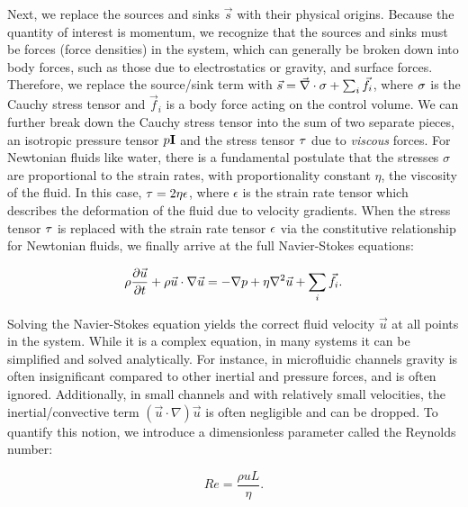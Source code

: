 			Next, we replace the sources and sinks $\vec{s}$ with their physical origins. Because the quantity of interest is momentum, we recognize that the sources and sinks must be forces (force densities) in the system, which can generally be broken down into body forces, such as those due to electrostatics or gravity, and surface forces. Therefore, we replace the source/sink term with $\vec{s}=\vec{\nabla}\cdot\mathbf{\sigma}+\sum_{i}\vec{f}_{i}$, where $\mathbf{\sigma}$ is the Cauchy stress tensor and $\vec{f}_{i}$ is a body force acting on the control volume. We can further break down the Cauchy stress tensor into the sum of two separate pieces, an isotropic pressure tensor $p\mathbf{I}$ and the stress tensor $\mathbf{\tau}$ due to \textit{viscous} forces. For Newtonian fluids like water, there is a fundamental postulate that the stresses $\sigma$ are proportional to the strain rates, with proportionality constant $\eta$, the viscosity of the fluid. In this case, $\mathbf{\tau}=2\eta\mathbf{\epsilon}$, where $\epsilon$ is the strain rate tensor which describes the deformation of the fluid due to velocity gradients. When the stress tensor $\mathbf{\tau}$ is replaced with the strain rate tensor $\mathbf{\epsilon}$ via the constitutive relationship for Newtonian fluids, we finally arrive at the full Navier-Stokes equations:
			
			\begin{equation} \label{eq:ns}
				\rho\frac{\partial \vec{u}}{\partial t}+\rho\vec{u}\cdot\mathbf{\nabla}\vec{u}=-\mathbf{\nabla}p+\eta\mathbf{\nabla}^{2}\vec{u}+\sum_{i}\vec{f}_{i}.
			\end{equation}
			
			Solving the Navier-Stokes equation yields the correct fluid velocity $\vec{u}$ at all points in the system. While it is a complex equation, in many systems it can be simplified and solved analytically. For instance, in microfluidic channels gravity is often insignificant compared to other inertial and pressure forces, and is often ignored. Additionally, in small channels and with relatively small velocities, the inertial/convective term $\left(\vec{u}\cdot\nabla\right)\vec{u}$ is often negligible and can be dropped. To quantify this notion, we introduce a dimensionless parameter called the Reynolds number:
			
			\begin{equation} \label{eq:reynoldsnum}
				Re=\frac{\rho u L}{\eta}.
			\end{equation}
			
